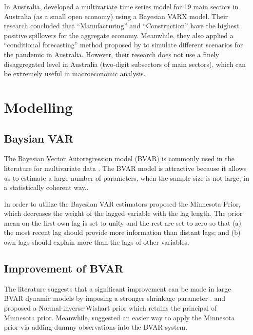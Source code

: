 \documentclass{monashthesis}
\begin{document}
In Australia, \textcite{anderson2020} developed a multivariate time series model for 19 main sectors in Australia (as a small open economy) using a Bayesian VARX model. Their research concluded that ``Manufacturing'' and ``Construction'' have the highest positive spillovers for the aggregate economy. Meanwhile, they also applied a ``conditional forecasting'' method proposed by \textcite{waggoner1999} to simulate different scenarios for the pandemic in Australia. However, their research does not use a finely disaggregated level in Australia (two-digit subsectors of main sectors), which can be extremely useful in macroeconomic analysis.

\hypertarget{modelling}{%
\section{Modelling}\label{modelling}}

\hypertarget{baysian-var}{%
\subsection{Baysian VAR}\label{baysian-var}}

The Bayesian Vector Autoregression model (BVAR) is commonly used in the literature for multivariate data \autocites[e.g.][]{anderson2020,litterman1986,banbura2010large}. The BVAR model is attractive because it allows us to estimate a large number of parameters, when the sample size is not large, in a statistically coherent way.\autocite{litterman1986,wozniak2016bayesian}.

In order to utilize the Bayesian VAR estimators \textcite{litterman1979} proposed the Minnesota Prior, which decreases the weight of the lagged variable with the lag length. The prior mean on the first own lag is set to unity and the rest are set to zero so that (a) the most recent lag should provide more information than distant lags; and (b) own lags should explain more than the lags of other variables.

\hypertarget{improvement-of-bvar}{%
\subsection{Improvement of BVAR}\label{improvement-of-bvar}}

The literature suggests that a significant improvement can be made in large BVAR dynamic models by imposing a stronger shrinkage parameter \autocite{banbura2010large,litterman1986}. \textcite{robertson1999vector} and \textcite{kadiyala1997} proposed a Normal-inverse-Wishart prior which retains the principal of Minnesota prior. Meanwhile, \textcite{banbura2010large} suggested an easier way to apply the Minnesota prior via adding dummy observations into the BVAR system.
\end{document}
